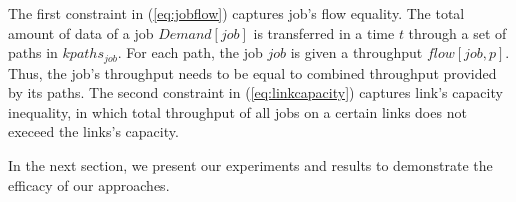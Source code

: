 %

The first constraint in (\ref{eq:jobflow}) captures job's flow equality. The total amount of data of a job $Demand[job]$ is transferred in a time $t$ through a set of paths in $kpaths_{job}$. For each path, the job $job$ is given a throughput $flow[job, p]$. Thus, the job's throughput needs to be equal to combined throughput provided by its paths. The second constraint in (\ref{eq:linkcapacity}) captures link's capacity inequality, in which total throughput of all jobs on a certain links does not execeed the links's capacity.

In the next section, we present our experiments and results to demonstrate the efficacy of our approaches.
